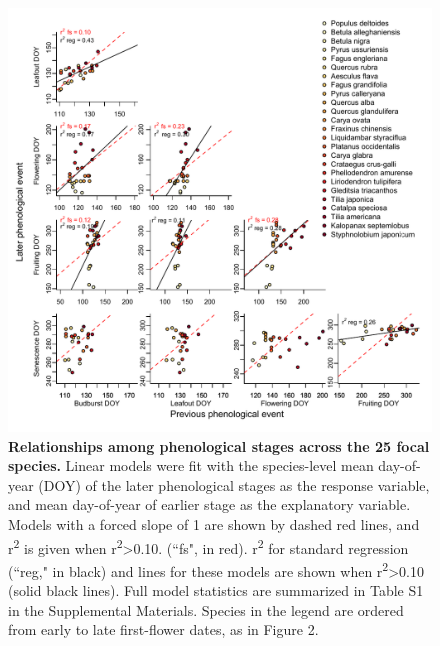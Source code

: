 \documentclass{article}
\begin{document}
  \begin{figure}[h]
  \centering
  \includegraphics{../analyses/figures/Hyp1_forcedslope_samerange.pdf}
  \caption{\textbf{Relationships among phenological stages across the 25 focal species.} Linear models were fit with the species-level mean day-of-year (DOY) of the later phenological stages as the response variable, and mean day-of-year of earlier stage as the explanatory variable. Models with a forced slope of 1 are shown by dashed red lines, and r\textsuperscript{2} is given when r\textsuperscript{2}>0.10. (``fs", in red).  r\textsuperscript{2} for standard regression (``reg," in black) and lines for these models are shown when r\textsuperscript{2}>0.10 (solid black lines). Full model statistics are summarized in Table S1 in the Supplemental Materials. Species in the legend are ordered from early to late first-flower dates, as in Figure 2.} 
  \label{fig:latevearly}
\end{figure}
\end{document}
